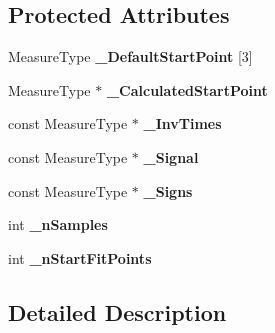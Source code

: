 \subsection*{Protected Attributes}
\begin{DoxyCompactItemize}
\item 
\hypertarget{class_ox_1_1_start_point_calculator_a2dd19fdfc59a7acc20812ca7f96387ad}{Measure\-Type {\bfseries \-\_\-\-Default\-Start\-Point} \mbox{[}3\mbox{]}}\label{class_ox_1_1_start_point_calculator_a2dd19fdfc59a7acc20812ca7f96387ad}

\item 
\hypertarget{class_ox_1_1_start_point_calculator_a90c26143db22a371533de08a87cdada0}{Measure\-Type $\ast$ {\bfseries \-\_\-\-Calculated\-Start\-Point}}\label{class_ox_1_1_start_point_calculator_a90c26143db22a371533de08a87cdada0}

\item 
\hypertarget{class_ox_1_1_start_point_calculator_a64929ca24726ddf99017b6f18cc03e29}{const Measure\-Type $\ast$ {\bfseries \-\_\-\-Inv\-Times}}\label{class_ox_1_1_start_point_calculator_a64929ca24726ddf99017b6f18cc03e29}

\item 
\hypertarget{class_ox_1_1_start_point_calculator_ae947a684f4a2cb29c36786490c9ca0b8}{const Measure\-Type $\ast$ {\bfseries \-\_\-\-Signal}}\label{class_ox_1_1_start_point_calculator_ae947a684f4a2cb29c36786490c9ca0b8}

\item 
\hypertarget{class_ox_1_1_start_point_calculator_abce7ef554368d8739ac27dddb63382df}{const Measure\-Type $\ast$ {\bfseries \-\_\-\-Signs}}\label{class_ox_1_1_start_point_calculator_abce7ef554368d8739ac27dddb63382df}

\item 
\hypertarget{class_ox_1_1_start_point_calculator_a17601c059cd679301597bc897e297c2f}{int {\bfseries \-\_\-n\-Samples}}\label{class_ox_1_1_start_point_calculator_a17601c059cd679301597bc897e297c2f}

\item 
\hypertarget{class_ox_1_1_start_point_calculator_a7c13748ff5fca507aa348ac6609cee47}{int {\bfseries \-\_\-n\-Start\-Fit\-Points}}\label{class_ox_1_1_start_point_calculator_a7c13748ff5fca507aa348ac6609cee47}

\end{DoxyCompactItemize}


\subsection{Detailed Description}
